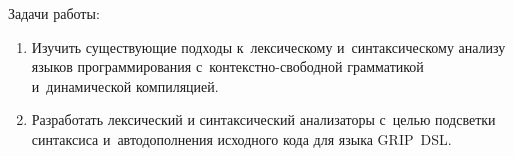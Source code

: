 Задачи работы: 
\begin{enumerate} 
	\item{Изучить существующие подходы к~лексическому и~синтаксическому анализу языков программирования с~контекстно-свободной грамматикой и~динамической компиляцией.}	
	\item{Разработать лексический и синтаксический анализаторы с~целью подсветки синтаксиса и~автодополнения исходного кода для языка GRIP~DSL.}
\end{enumerate} 


%

